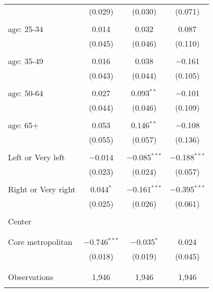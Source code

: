 \begin{tabular}{@{\extracolsep{5pt}}lccc}
  & (0.029) & (0.030) & (0.071) \\ 
  & & & \\ 
 age: 25-34 & 0.014 & 0.032 & 0.087 \\ 
  & (0.045) & (0.046) & (0.110) \\ 
  & & & \\ 
 age: 35-49 & 0.016 & 0.038 & $-$0.161 \\ 
  & (0.043) & (0.044) & (0.105) \\ 
  & & & \\ 
 age: 50-64 & 0.027 & 0.093$^{**}$ & $-$0.101 \\ 
  & (0.044) & (0.046) & (0.109) \\ 
  & & & \\ 
 age: 65+ & 0.053 & 0.146$^{**}$ & $-$0.108 \\ 
  & (0.055) & (0.057) & (0.136) \\ 
  & & & \\ 
 Left or Very left & $-$0.014 & $-$0.085$^{***}$ & $-$0.188$^{***}$ \\ 
  & (0.023) & (0.024) & (0.057) \\ 
  & & & \\ 
 Right or Very right & 0.044$^{*}$ & $-$0.161$^{***}$ & $-$0.395$^{***}$ \\ 
  & (0.025) & (0.026) & (0.061) \\ 
  & & & \\ 
 Center &  &  &  \\ 
  &  &  &  \\ 
  & & & \\ 
 Core metropolitan & $-$0.746$^{***}$ & $-$0.035$^{*}$ & 0.024 \\ 
  & (0.018) & (0.019) & (0.045) \\ 
  & & & \\ 
\hline \\[-1.8ex] 

Observations & 1,946 & 1,946 & 1,946 \\ 
\hline 
\hline \\[-1.8ex] 
\end{tabular} 